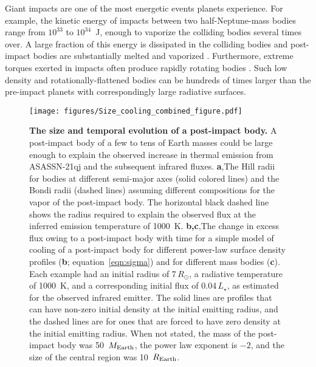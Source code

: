 \documentclass[sn-nature,oneside]{sn-jnl}%
\begin{document}
Giant impacts are one of the most energetic events planets experience.
%
For example, the kinetic energy of impacts between two half-Neptune-mass bodies range from $10^{33}$ to $10^{34}$~J, enough to vaporize the colliding bodies several times over.
%
A large fraction of this energy is dissipated in the colliding bodies and post-impact bodies are substantially melted and vaporized \cite{Nakajima2015,Lock2017,Carter2020}.
%
Furthermore, extreme torques exerted in impacts often produce rapidly rotating bodies \cite{Lock2017}.
%
Such low density and rotationally-flattened bodies can be hundreds of times larger than the pre-impact planets \cite{Lock2017} with correspondingly large radiative surfaces.



\begin{figure}
\begin{centering}
\texttt{[image: figures/Size\_cooling\_combined\_figure.pdf]}
\caption{\textbf{The size and temporal evolution of a post-impact body.}
%
A post-impact body of a few to tens of Earth masses could be large enough to explain the observed increase in thermal emission from ASASSN-21qj and the subsequent infrared fluxes.
%
{\bf a},The Hill radii for bodies at different semi-major axes (solid colored lines) and the Bondi radii (dashed lines) assuming different compositions for the vapor of the post-impact body.
%
The horizontal black dashed line shows the radius required to explain the observed flux at the inferred emission temperature of 1000~K. 
%
{\bf b,c},The change in excess flux owing to a post-impact body with time for a simple model of cooling of a post-impact body for different power-law surface density profiles ({\bf b}; equation~\ref{eqn:sigma}) and for different mass bodies ({\bf c}).
%
Each example had an initial radius of 7\,$R_\odot$, a radiative temperature of 1000~K, and a corresponding initial flux of 0.04\,$L_\star$, as estimated for the observed infrared emitter.
%
The solid lines are profiles that can have non-zero initial density at the initial emitting radius, and the dashed lines are for ones that are forced to have zero density at the initial emitting radius.
%
When not stated, the mass of the post-impact body was 50~$M_{\rm Earth}$, the power law exponent is $-2$, and the size of the central region was 10~$R_{\rm Earth}$.
}
\label{fig:Hill_Bondi_R}

\end{centering}
\end{figure}
\end{document}

